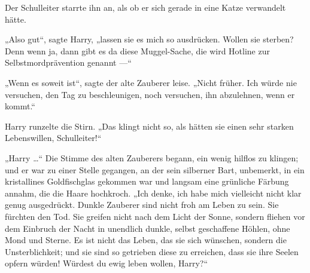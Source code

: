Der Schulleiter starrte ihn an, als ob er sich gerade in eine Katze verwandelt hätte.

„Also gut“, sagte Harry, „lassen sie es mich so ausdrücken. Wollen sie sterben? Denn wenn ja, dann gibt es da diese Muggel-Sache, die wird Hotline zur Selbstmordprävention genannt —“

„Wenn es soweit ist“, sagte der alte Zauberer leise.
„Nicht früher. Ich würde nie versuchen, den Tag zu beschleunigen, noch versuchen, ihn abzulehnen, wenn er kommt.“

Harry runzelte die Stirn.
„Das klingt nicht so, als hätten sie einen sehr starken Lebenswillen, Schulleiter!“

„Harry …“ Die Stimme des alten Zauberers begann, ein wenig hilflos zu klingen; und er war zu einer Stelle gegangen, an der sein silberner Bart, unbemerkt, in ein kristallines Goldfischglas gekommen war und langsam eine grünliche Färbung annahm, die die Haare hochkroch.
„Ich denke, ich habe mich vielleicht nicht klar genug ausgedrückt. Dunkle Zauberer sind nicht froh am Leben zu sein. Sie fürchten den Tod. Sie greifen nicht nach dem Licht der Sonne, sondern fliehen vor dem Einbruch der Nacht in unendlich dunkle, selbst geschaffene Höhlen, ohne Mond und Sterne. Es ist nicht das Leben, das sie sich wünschen, sondern die Unsterblichkeit; und sie sind so getrieben diese zu erreichen, dass sie ihre Seelen opfern würden! Würdest du ewig leben wollen, Harry?“

